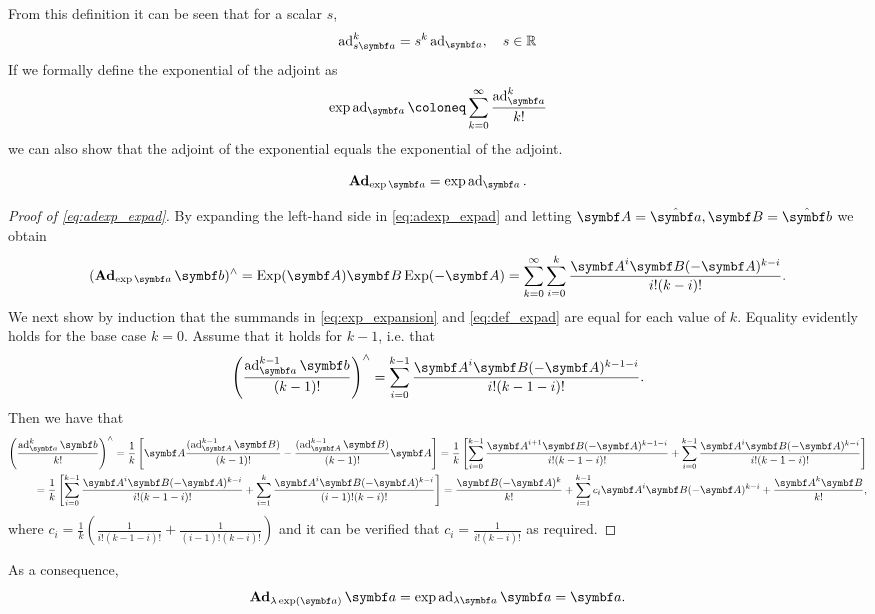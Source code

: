 From this definition it can be seen that for a scalar $s$,
\begin{equation}
  \label{eq:ad_scaling}
  \ad_{s \a}^k = s^k \ad_\a, \quad s \in \mathbb{R}
\end{equation}
If we formally define the exponential of the adjoint as
\begin{equation}
  \label{eq:def_expad}
  \exp \ad_\a \coloneq \sum_{k=0}^\infty \frac{\ad^k_\a}{k!}
\end{equation}
we can also show that the adjoint of the exponential equals the exponential of the adjoint.
\begin{properties}
  \begin{equation}
    \label{eq:adexp_expad}
    \bAd_{\exp \a} = \exp \ad_\a.
  \end{equation}
\end{properties}
\begin{proof}[Proof of \eqref{eq:adexp_expad}]
  By expanding the left-hand side in \eqref{eq:adexp_expad} and letting $\A = \hat \a, \B = \hat \b$ we obtain
  \begin{equation}
    \label{eq:exp_expansion}
    (\bAd_{\exp \a} \b)^\wedge = \Exp (\A) \B \Exp (-\A) = \sum_{k=0}^\infty \sum_{i = 0}^{k} \frac{\A^i \B (-\A)^{k-i}}{i! (k - i)!}.
  \end{equation}
  We next show by induction that the summands in \eqref{eq:exp_expansion} and \eqref{eq:def_expad} are equal for each value of $k$. Equality evidently holds for the base case $k=0$. Assume that it holds for $k-1$, i.e. that
  \begin{equation}
    \left( \frac{\ad_{\a}^{k-1} \b}{(k-1)!} \right)^\wedge = \sum_{i=0}^{k-1} \frac{\A^i \B (-\A)^{k-1-i}}{i! (k-1-i)!}.
  \end{equation}
  Then we have that
  \begin{equation*}
    \begin{aligned}
      \left( \frac{\ad_\a^{k} \b}{k!} \right)^\wedge = \frac{1}{k} \left[ \A \frac{(\ad_\A^{k-1} \B)}{(k-1)!} - \frac{(\ad_\A^{k-1} \B)}{(k-1)!} \A \right] =
      \frac{1}{k} \left[ \sum_{i=0}^{k-1} \frac{\A^{i+1} \B (-\A)^{k-1-i}}{i! (k-1-i)!} + \sum_{i=0}^{k-1} \frac{\A^i \B (-\A)^{k-i}}{i! (k-1-i)!} \right] \\
      = \frac{1}{k} \left[ \sum_{i=0}^{k-1} \frac{\A^i \B (-\A)^{k-i}}{i! (k-1-i)!} +  \sum_{i=1}^{k} \frac{\A^{i} \B (-\A)^{k-i}}{(i-1)! (k-i)!} \right] = \frac{\B (-\A)^k}{k!} + \sum_{i=1}^{k-1} c_i \A^i \B (-\A)^{k-i} + \frac{\A^k \B}{k!},
    \end{aligned}
  \end{equation*}
  where $c_i = \frac{1}{k} \left( \frac{1}{i!(k-1-i)!} + \frac{1}{(i-1)!(k-i)!} \right)$ and it can be verified that $c_i = \frac{1}{i!(k-i)!}$ as required.
\end{proof}
As a consequence,
\begin{equation}
  \label{eq:ad_exp_a_a}
  \bAd_{\lambda \exp(\a)} \a = \exp \ad_{\lambda \a} \a = \a.
\end{equation}

